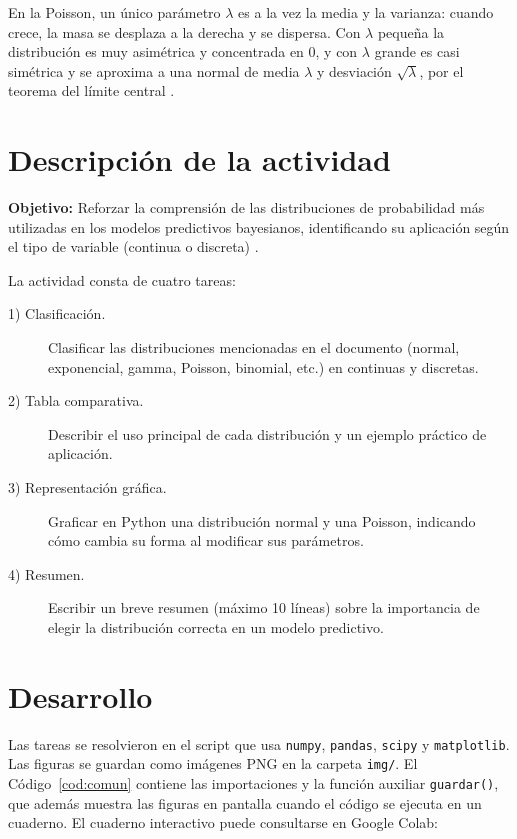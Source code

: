 \documentclass[11pt,letterpaper]{article}
\begin{document}
En la Poisson, un único parámetro $\lambda$ es a la vez la media y la varianza: cuando crece, la masa se desplaza a la derecha y se dispersa. Con $\lambda$ pequeña la distribución es muy asimétrica y concentrada en 0, y con $\lambda$ grande es casi simétrica y se aproxima a una normal de media $\lambda$ y desviación $\sqrt{\lambda}$, por el teorema del límite central \parencite{tecnm2026_documento_fuente}.

\section{Descripción de la actividad}

\textbf{Objetivo:} Reforzar la comprensión de las distribuciones de probabilidad más utilizadas en los modelos predictivos bayesianos, identificando su aplicación según el tipo de variable (continua o discreta) \parencite{tecnm2026_documento_fuente}.

La actividad consta de cuatro tareas:

\begin{description}
    \item[1) Clasificación.] Clasificar las distribuciones mencionadas en el documento (normal, exponencial, gamma, Poisson, binomial, etc.) en continuas y discretas.
    \item[2) Tabla comparativa.] Describir el uso principal de cada distribución y un ejemplo práctico de aplicación.
    \item[3) Representación gráfica.] Graficar en Python una distribución normal y una Poisson, indicando cómo cambia su forma al modificar sus parámetros.
    \item[4) Resumen.] Escribir un breve resumen (máximo 10 líneas) sobre la importancia de elegir la distribución correcta en un modelo predictivo.
\end{description}

\section{Desarrollo}

Las tareas se resolvieron en el script que usa \texttt{numpy}, \texttt{pandas}, \texttt{scipy} y \texttt{matplotlib}. Las figuras se guardan como imágenes PNG en la carpeta \texttt{img/}. El Código~\ref{cod:comun} contiene las importaciones y la función auxiliar \texttt{guardar()}, que además muestra las figuras en pantalla cuando el código se ejecuta en un cuaderno. El cuaderno interactivo puede consultarse en Google Colab:
\end{document}
